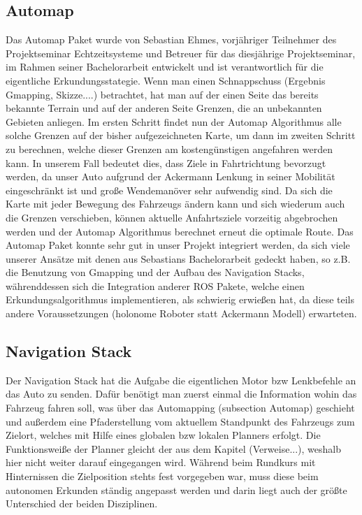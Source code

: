\documentclass{article}
\begin{document}
\subsection{Automap}
\label{subsec:automap}
Das Automap Paket wurde von Sebastian Ehmes, vorjähriger Teilnehmer des Projektseminar Echtzeitsysteme und Betreuer für das diesjährige Projektseminar, im Rahmen seiner Bachelorarbeit entwickelt und ist verantwortlich für die eigentliche Erkundungsstategie. Wenn man einen Schnappschuss (Ergebnis Gmapping, Skizze....) betrachtet, hat man auf der einen Seite das bereits bekannte Terrain und auf der anderen Seite Grenzen, die an unbekannten Gebieten anliegen. Im ersten Schritt findet nun der Automap Algorithmus alle solche Grenzen auf der bisher aufgezeichneten Karte, um dann im zweiten Schritt zu berechnen, welche dieser Grenzen am kostengünstigen angefahren werden kann. In unserem Fall bedeutet dies, dass Ziele in Fahrtrichtung bevorzugt werden, da unser Auto aufgrund der Ackermann Lenkung in seiner Mobilität eingeschränkt ist und große Wendemanöver sehr aufwendig sind. Da sich die Karte mit jeder Bewegung des Fahrzeugs ändern kann und sich wiederum auch die Grenzen verschieben, können aktuelle Anfahrtsziele vorzeitig abgebrochen werden und der Automap Algorithmus berechnet erneut die optimale Route. Das Automap Paket konnte sehr gut in unser Projekt integriert werden, da sich viele unserer Ansätze mit denen aus Sebastians Bachelorarbeit gedeckt haben, so z.B. die Benutzung von Gmapping und der Aufbau des Navigation Stacks, währenddessen sich die Integration anderer ROS Pakete, welche einen Erkundungsalgorithmus implementieren, als schwierig erwießen hat, da diese teils andere Voraussetzungen (holonome Roboter statt Ackermann Modell) erwarteten.

\subsection{Navigation Stack}
\label{subsec:navigationstack}
Der Navigation Stack hat die Aufgabe die eigentlichen Motor bzw Lenkbefehle an das Auto zu senden. Dafür benötigt man zuerst einmal die Information wohin das Fahrzeug fahren soll, was über das Automapping (subsection Automap) geschieht und außerdem eine Pfaderstellung vom aktuellem Standpunkt des Fahrzeugs zum Zielort, welches mit Hilfe eines globalen bzw lokalen Planners erfolgt. Die Funktionsweiße der Planner gleicht der aus dem Kapitel (Verweise...), weshalb hier nicht weiter darauf eingegangen wird. Während beim Rundkurs mit Hinternissen die Zielposition stehts fest vorgegeben war, muss diese beim autonomen Erkunden ständig angepasst werden und darin liegt auch der größte Unterschied der beiden Disziplinen. 
\end{document}
